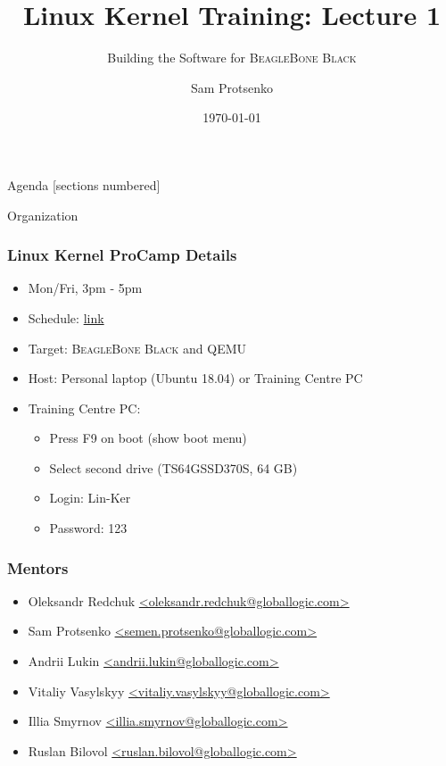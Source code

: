 \documentclass[aspectratio=169]{beamer}
\title{Linux Kernel Training: Lecture 1}
\subtitle{Building the Software for \textsc{BeagleBone Black}}
\date{\today}
\author{Sam Protsenko}
\institute{GlobalLogic}
\begin{document}
\maketitle

\begin{frame}{Agenda}
  [sections numbered]
  \tableofcontents[hideallsubsections]
\end{frame}

\begin{frame}[standout]
  Organization
\end{frame}

\begin{frame}
  \frametitle{Linux Kernel ProCamp Details}
  \begin{itemize}
  \item Mon/Fri, 3pm - 5pm
  \item Schedule: \href{https://docs.google.com/spreadsheets/d/1-phJXfXE7oJCl6RYvqWh\_D2ELcz4xeRTiTvYohZn0wI/edit\#gid=0}{link}
  \item Target: \textsc{BeagleBone Black} and QEMU
  \item Host: Personal laptop (Ubuntu 18.04) or Training Centre PC
  \item Training Centre PC:
    \begin{itemize}
    \item Press F9 on boot (show boot menu)
    \item Select second drive (TS64GSSD370S, 64 GB)
    \item Login: Lin-Ker
    \item Password: 123
    \end{itemize}
  \end{itemize}
\end{frame}

\begin{frame}
  \frametitle{Mentors}
  \begin{itemize}
  \item Oleksandr Redchuk \href{mailto:oleksandr.redchuk@globallogic.com}{<oleksandr.redchuk@globallogic.com>}
  \item Sam Protsenko \href{mailto:semen.protsenko@globallogic.com}{<semen.protsenko@globallogic.com>}
  \item Andrii Lukin \href{mailto:andrii.lukin@globallogic.com}{<andrii.lukin@globallogic.com>}
  \item Vitaliy Vasylskyy \href{mailto:vitaliy.vasylskyy@globallogic.com}{<vitaliy.vasylskyy@globallogic.com>}
  \item Illia Smyrnov \href{mailto:illia.smyrnov@globallogic.com}{<illia.smyrnov@globallogic.com>}
  \item Ruslan Bilovol \href{mailto:ruslan.bilovol@globallogic.com}{<ruslan.bilovol@globallogic.com>}
  \end{itemize}
\end{frame}
\end{document}
